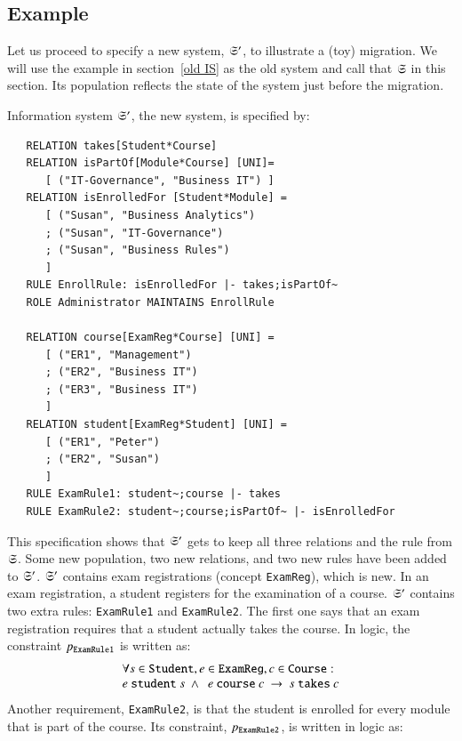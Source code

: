 \documentclass{elsarticle}
\begin{document}
\subsection{Example}
   Let us proceed to specify a new system, $\mathfrak{S}'$, to illustrate a (toy) migration.
   We will use the example in section~\ref{old IS} as the old system
   and call that $\mathfrak{S}$ in this section.
   Its population reflects the state of the system just before the migration.

   Information system $\mathfrak{S}'$, the new system, is specified by:
\begin{verbatim}
   RELATION takes[Student*Course]
   RELATION isPartOf[Module*Course] [UNI]=
      [ ("IT-Governance", "Business IT") ]
   RELATION isEnrolledFor [Student*Module] =
      [ ("Susan", "Business Analytics")
      ; ("Susan", "IT-Governance")
      ; ("Susan", "Business Rules")
      ]
   RULE EnrollRule: isEnrolledFor |- takes;isPartOf~
   ROLE Administrator MAINTAINS EnrollRule
   
   RELATION course[ExamReg*Course] [UNI] =
      [ ("ER1", "Management")
      ; ("ER2", "Business IT")
      ; ("ER3", "Business IT")
      ]
   RELATION student[ExamReg*Student] [UNI] =
      [ ("ER1", "Peter")
      ; ("ER2", "Susan")
      ]
   RULE ExamRule1: student~;course |- takes
   RULE ExamRule2: student~;course;isPartOf~ |- isEnrolledFor
\end{verbatim}
   This specification shows that $\mathfrak{S}'$ gets to keep all three relations and the rule from $\mathfrak{S}$.
   Some new population, two new relations, and two new rules have been added to $\mathfrak{S}'$.
   $\mathfrak{S}'$ contains exam registrations (concept \verb-ExamReg-), which is new.
   In an exam registration, a student registers for the examination of a course.
   $\mathfrak{S}'$ contains two extra rules: \verb-ExamRule1- and \verb-ExamRule2-.
   The first one says that an exam registration requires that a student actually takes the course.
   In logic, the constraint $p_{\tt ExamRule1}$ is written as:
\[\begin{array}{l}\forall s\in\text{\tt Student}, e\in\text{\tt ExamReg}, c\in\text{\tt Course}:\\
   e\ \text{\tt student}\ s\ \wedge\ \ e\ \text{\tt course}\ c\ \rightarrow\ s\ \text{\tt takes}\ c\\
\end{array}\]
   Another requirement, \verb-ExamRule2-, is that the student is enrolled for every module that is part of the course.
   Its constraint, $p_{\tt ExamRule2}$, is written in logic as:
\end{document}
